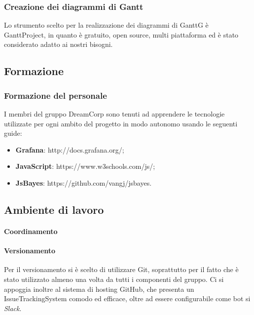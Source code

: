                 \subsubsection{Creazione dei diagrammi di Gantt}
                    Lo strumento scelto per la realizzazione dei diagrammi di GanttG è GanttProject,
                    in quanto è gratuito, open source, multi piattaforma ed è stato considerato adatto
                    ai nostri bisogni.
                \subsection{Formazione}            
                    \subsubsection{Formazione del personale}
                        I membri del gruppo DreamCorp sono tenuti ad apprendere le tecnologie utilizzate per ogni ambito del progetto in modo autonomo usando le seguenti guide:
                    \begin{itemize}
                        \item \textbf{Grafana}: http://docs.grafana.org/;
                        \item \textbf{JavaScript}: https://www.w3schools.com/js/;
                        \item \textbf{JsBayes}: https://github.com/vangj/jsbayes.
                    \end{itemize}
                \subsection{Ambiente di lavoro}
                    \paragraph{Coordinamento}
                        \paragraph{Versionamento} 
                            Per il versionamento si è scelto di utilizzare Git, soprattutto per il fatto che è stato utilizzato almeno una volta da tutti i componenti del gruppo. Ci si appoggia inoltre al sistema di hosting GitHub, che presenta un IssueTrackingSystem comodo ed efficace, oltre ad essere configurabile come bot si \textit{Slack}.
